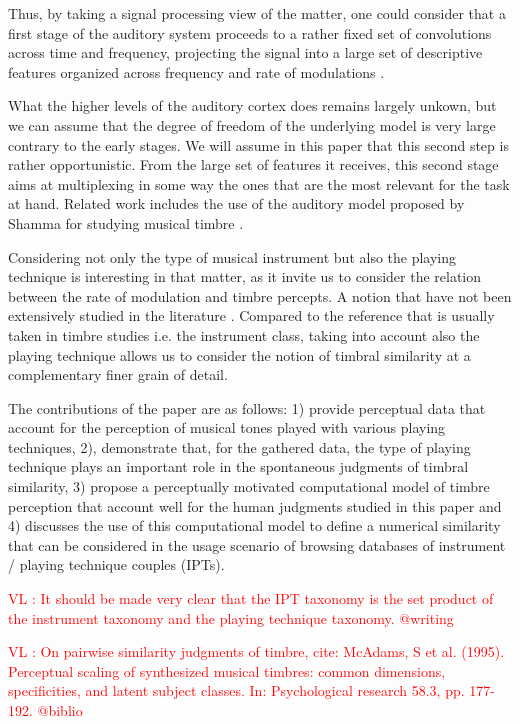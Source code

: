 \documentclass{article}
\makeatletter
\newcommand*{\ie}{i.e.\@\xspace}
\newcommand{\ipts}{IPTs\xspace}
\newcommand{\vl}[1]{\textcolor{red}{VL : #1}}
\makeatother
\begin{document}
Thus, by taking a signal processing view of the matter, one could consider that a first stage of the auditory system proceeds to a rather fixed set of convolutions across time and frequency, projecting the signal into a large set of descriptive features organized across frequency and rate of modulations \cite{anden2014deep}.

What the higher levels of the auditory cortex does remains largely unkown, but we can assume that the degree of freedom of the underlying model is very large contrary to the early stages.  We will assume in this paper that this second step is rather opportunistic. From the large set of features it receives, this second stage aims at multiplexing in some way the ones that are the most relevant for the task at hand. Related work includes the use of the auditory model proposed by Shamma for studying musical timbre \cite{patil2012music}.

Considering not only the type of musical instrument but also the playing technique is interesting in that matter, as it invite us to consider the relation between the rate of modulation and timbre percepts. A notion that have not been extensively studied in the literature \cite{burred2010dynamic}. Compared to the reference that is usually taken in timbre studies \ie{} the instrument class, taking into account also the playing technique allows us to consider the notion of timbral similarity at a complementary finer grain of detail.

The contributions of the paper are as follows:
1) provide perceptual data that account for the perception of musical tones played with various playing techniques, 2), demonstrate that, for the gathered data, the type of playing technique plays an important role in the spontaneous judgments of timbral similarity, 3) propose a perceptually motivated computational model of timbre perception that account well for the human judgments studied in this paper and 4) discusses the use of this computational model to define a numerical similarity that can be considered in the usage scenario of browsing databases of instrument / playing technique couples (\ipts).

\vl{It should be made very clear that the IPT taxonomy is
the set product of the instrument taxonomy
and the playing technique taxonomy. @writing}

\vl{On pairwise similarity judgments of timbre, cite:
McAdams, S et al. (1995). Perceptual scaling of synthesized musical
timbres: common dimensions, specificities, and latent subject
classes. In: Psychological research 58.3, pp. 177-192.
@biblio}
\end{document}
